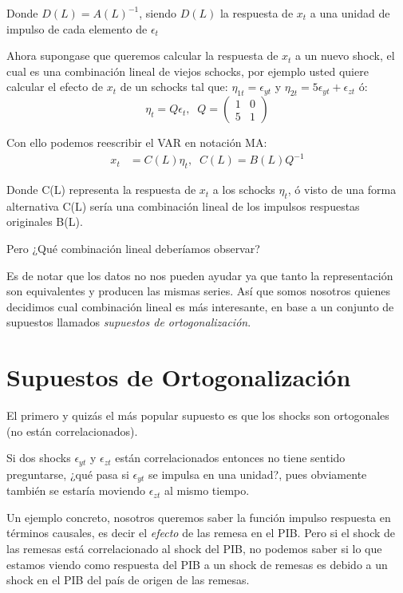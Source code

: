 \documentclass[
]{book}
\begin{document}
Donde \(D(L)=A(L)^{-1}\), siendo \(D(L)\) la respuesta de \(x_{t}\) a una unidad de impulso de cada elemento de \(\epsilon_{t}\)

Ahora supongase que queremos calcular la respuesta de \(x_{t}\) a un nuevo shock, el cual es una combinación lineal de viejos schocks, por ejemplo usted quiere calcular el efecto de \(x_{t}\) de un schocks tal que: \(\eta_{1t}=\epsilon_{yt}\) y \(\eta_{2t}=5\epsilon_{yt}+\epsilon_{zt}\) ó:
\begin{equation}
\eta_{t}=Q\epsilon_{t},\;\;Q=\left( \begin{array}{cc}
    1 & 0\\
    5 & 1
\end{array}
\right) \nonumber
\end{equation}

Con ello podemos reescribir el VAR en notación MA:
\begin{align}
x_{t}&=C(L)\eta_{t},\;\;C(L)=B(L)Q^{-1}
\end{align}

Donde C(L) representa la respuesta de \(x_{t}\) a los schocks \(\eta_{t}\), ó visto de una forma alternativa C(L) sería una combinación lineal de los impulsos respuestas originales B(L).

Pero ¿Qué combinación lineal deberíamos observar?

Es de notar que los datos no nos pueden ayudar ya que tanto la representación son equivalentes y producen las mismas series. Así que somos nosotros quienes decidimos cual combinación lineal es más interesante, en base a un conjunto de supuestos llamados \emph{supuestos de ortogonalización}.

\hypertarget{supuestos-de-ortogonalizaciuxf3n}{%
\section{Supuestos de Ortogonalización}\label{supuestos-de-ortogonalizaciuxf3n}}

El primero y quizás el más popular supuesto es que los shocks son ortogonales (no están correlacionados).

Si dos shocks \(\epsilon_{yt}\) y \(\epsilon_{zt}\) están correlacionados entonces no tiene sentido preguntarse, ¿qué pasa si \(\epsilon_{yt}\) se impulsa en una unidad?, pues obviamente también se estaría moviendo \(\epsilon_{zt}\) al mismo tiempo.

Un ejemplo concreto, nosotros queremos saber la función impulso respuesta en términos causales, es decir el \emph{efecto} de las remesa en el PIB. Pero si el shock de las remesas está correlacionado al shock del PIB, no podemos saber si lo que estamos viendo como respuesta del PIB a un shock de remesas es debido a un shock en el PIB del país de origen de las remesas.
\end{document}
